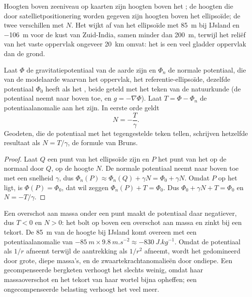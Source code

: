 Hoogten boven zeeniveau op kaarten zijn hoogten boven het ; de hoogten die door satellietpositionering worden gegeven zijn hoogten boven het ellipsoïde; de twee verschillen met $N$. Het  wijkt af van het ellipsoïde met \qty{+85}{m} bij IJsland en \qty{-106}{m} voor de kust van Zuid-India, samen minder dan \qty{200}{m}, terwijl het reliëf van het vaste oppervlak ongeveer \qty{20}{km} omvat: het  is een veel gladder oppervlak dan de grond.

\begin{proposition}\label{prop:b1:isostasy-gravity:bruns}
Laat $\Phi$ de gravitatiepotentiaal van de aarde zijn en $\Phi_n$ de normale potentiaal, die van de modelaarde waarvan het oppervlak, het referentie-ellipsoïde, dezelfde potentiaal $\Phi_0$ heeft als het , beide geteld met het teken van de natuurkunde (de potentiaal neemt naar boven toe, en $g = -\nabla\Phi$). Laat $T = \Phi - \Phi_n$ de potentiaalanomalie aan het  zijn. In eerste orde geldt
\[
  N = -\frac{T}{\gamma} .
\]
Geodeten, die de potentiaal met het tegengestelde teken tellen, schrijven hetzelfde resultaat als $N = T/\gamma$, de formule van Bruns.
\end{proposition}

\begin{proof}
Laat $Q$ een punt van het ellipsoïde zijn en $P$ het punt van het  op de normaal door $Q$, op de hoogte $N$. De normale potentiaal neemt naar boven toe met een snelheid $\gamma$, dus $\Phi_n(P) \approx \Phi_n(Q) + \gamma N = \Phi_0 +
\gamma N$. Omdat $P$ op het  ligt, is $\Phi(P) = \Phi_0$, dat wil zeggen
$\Phi_n(P) + T = \Phi_0$. Dus $\Phi_0 + \gamma N + T = \Phi_0$ en $N =
-T/\gamma$.
\end{proof}

Een overschot aan massa onder een punt maakt de potentiaal daar negatiever, dus $T < 0$ en $N > 0$: het  bolt op boven een overschot aan massa en zinkt bij een tekort. De \qty{85}{m} van de hoogte bij IJsland komt overeen met een potentiaalanomalie van $-\qty{85}{m}\times\qty{9.8}{m.s^{-2}} \approx \qty{-830}{J.kg^{-1}}$. Omdat de potentiaal als $1/r$ afneemt terwijl de aantrekking als $1/r^2$ afneemt, wordt het  gedomineerd door grote, diepe massa's, en de zwaartekrachtanomalieën door ondiepe. Een gecompenseerde bergketen verhoogt het  slechts weinig, omdat haar massaoverschot en het tekort van haar wortel bijna opheffen; een ongecompenseerde belasting verhoogt het veel meer.


